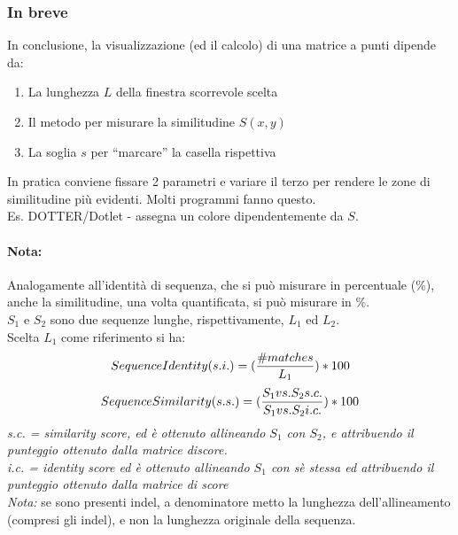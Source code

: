 \documentclass{article}
\begin{document}
\subsubsection{In breve}
In conclusione, la visualizzazione (ed il calcolo) di una
matrice a punti dipende da:
\begin{enumerate}
    \item La lunghezza $L$ della finestra scorrevole scelta
    \item Il metodo per misurare la similitudine $S(x,y)$
    \item La soglia $s$ per “marcare” la casella rispettiva
\end{enumerate}
In pratica conviene fissare 2 parametri e variare il terzo per rendere le zone di
similitudine più evidenti. Molti programmi fanno questo.\\
Es. DOTTER/Dotlet - assegna un colore dipendentemente da $S$.
\paragraph{Nota:}Analogamente all'identità di sequenza, che si può
misurare in percentuale (\%), anche la similitudine, una volta
quantificata, si può misurare in \%.\\
$S_1$ e $S_2$ sono due sequenze lunghe, rispettivamente, $L_1$ ed $L_2$.\\
Scelta $L_1$ come riferimento si ha:
$$ SequenceIdentity(s.i.) = ({\#matches \over L_1}) * 100 $$
$$ SequenceSimilarity(s.s.) = ({S_1 vs. S_2 s.c. \over S_1 vs. S_2 i.c.}) * 100 $$
\textit{s.c. = similarity score, ed è ottenuto allineando $S_1$ con $S_2$, e attribuendo il punteggio ottenuto dalla matrice discore.\\i.c. = identity score ed è ottenuto allineando $S_1$ con sè stessa ed attribuendo il punteggio ottenuto dalla matrice di score}
\textit{\\Nota:} se sono presenti indel, a denominatore metto la lunghezza
dell'allineamento (compresi gli indel), e non la lunghezza originale della sequenza.
\end{document}
